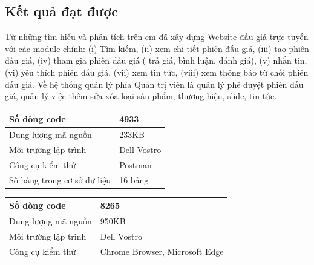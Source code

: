 \documentclass[../DoAn.tex]{subfiles}
\begin{document}
\subsection{Kết quả đạt được}
Từ những tìm hiểu và phân tích trên em đã xây dựng Website đấu giá trực tuyến với các module chính: (i) Tìm kiếm, (ii) xem chi tiết phiên đấu giá, (iii) tạo phiên đấu giá, (iv) tham gia phiên đấu giá ( trả giá, bình luận, đánh giá), (v) nhắn tin, (vi) yêu thích phiên đấu giá, (vii) xem tin tức, (viii) xem thông báo từ chối phiên đấu giá. Về hệ thống quản lý phía Quản trị viên là quản lý phê duyệt phiên đấu giá, quản lý việc thêm sửa xóa loại sản phẩm, thương hiệu, slide, tin tức.
    \tabletail{\hline}
    \label{bang410}
    \begin{supertabular}{| p{.45\textwidth}| p{.45\textwidth} |} 
    \hline
        Số dòng code& 4933\\\hline
        Dung lượng mã nguồn&233KB \\\hline
        Môi trường lập trình&Dell Vostro \\\hline
        Công cụ kiểm thử & Postman\\\hline
        Số bảng trong cơ sở dữ liệu  &16 bảng \\\hline
    \end{supertabular}
    \tabletail{\hline}
    \label{bang411}
    \begin{supertabular}{| p{.45\textwidth}| p{.45\textwidth} |} 
    \hline
        Số dòng code& 8265\\\hline
        Dung lượng mã nguồn&950KB \\\hline
        Môi trường lập trình&Dell Vostro \\\hline
        Công cụ kiểm thử & Chrome Browser, Microsoft Edge\\\hline
    \end{supertabular}
\end{document}
